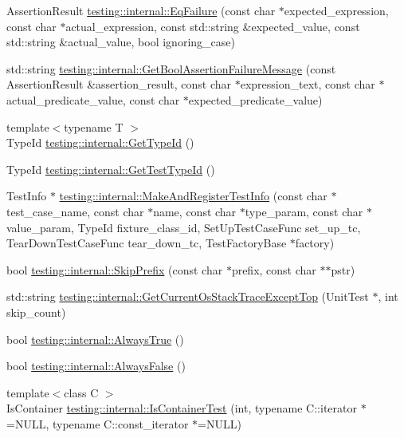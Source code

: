\begin{DoxyCompactItemize}
Assertion\-Result \hyperlink{namespacetesting_1_1internal_a08725846ff184d3e79bcf5be4df19157}{testing\-::internal\-::\-Eq\-Failure} (const char $\ast$expected\-\_\-expression, const char $\ast$actual\-\_\-expression, const std\-::string \&expected\-\_\-value, const std\-::string \&actual\-\_\-value, bool ignoring\-\_\-case)
\item 
std\-::string \hyperlink{namespacetesting_1_1internal_a5fd6e5dc9eb20ab3c3a80e24d89dfac6}{testing\-::internal\-::\-Get\-Bool\-Assertion\-Failure\-Message} (const Assertion\-Result \&assertion\-\_\-result, const char $\ast$expression\-\_\-text, const char $\ast$actual\-\_\-predicate\-\_\-value, const char $\ast$expected\-\_\-predicate\-\_\-value)
\item 
{\footnotesize template$<$typename T $>$ }\\Type\-Id \hyperlink{namespacetesting_1_1internal_a6b108e56fdc68ea937ffb3759fb55ab0}{testing\-::internal\-::\-Get\-Type\-Id} ()
\item 
Type\-Id \hyperlink{namespacetesting_1_1internal_ad0d66d56ead224263cd100c1d6bfc562}{testing\-::internal\-::\-Get\-Test\-Type\-Id} ()
\item 
Test\-Info $\ast$ \hyperlink{namespacetesting_1_1internal_a8280dfb4f7c8d5b71184f91f4725f759}{testing\-::internal\-::\-Make\-And\-Register\-Test\-Info} (const char $\ast$test\-\_\-case\-\_\-name, const char $\ast$name, const char $\ast$type\-\_\-param, const char $\ast$value\-\_\-param, Type\-Id fixture\-\_\-class\-\_\-id, Set\-Up\-Test\-Case\-Func set\-\_\-up\-\_\-tc, Tear\-Down\-Test\-Case\-Func tear\-\_\-down\-\_\-tc, Test\-Factory\-Base $\ast$factory)
\item 
bool \hyperlink{namespacetesting_1_1internal_a244d9a3765727306b597b8992ab84036}{testing\-::internal\-::\-Skip\-Prefix} (const char $\ast$prefix, const char $\ast$$\ast$pstr)
\item 
std\-::string \hyperlink{namespacetesting_1_1internal_a7ca65eb9f24d89fbc1e8cb108d3c6339}{testing\-::internal\-::\-Get\-Current\-Os\-Stack\-Trace\-Except\-Top} (Unit\-Test $\ast$, int skip\-\_\-count)
\item 
bool \hyperlink{namespacetesting_1_1internal_a922c9da63cd4bf94fc473b9ecac76414}{testing\-::internal\-::\-Always\-True} ()
\item 
bool \hyperlink{namespacetesting_1_1internal_a4b24c851ab13569b1b15b3d259b60d2e}{testing\-::internal\-::\-Always\-False} ()
\item 
{\footnotesize template$<$class C $>$ }\\Is\-Container \hyperlink{namespacetesting_1_1internal_acb6ea1086293c1d6636e3c67941351fb}{testing\-::internal\-::\-Is\-Container\-Test} (int, typename C\-::iterator $\ast$=N\-U\-L\-L, typename C\-::const\-\_\-iterator $\ast$=N\-U\-L\-L)
$$
\end{DoxyCompactItemize}
